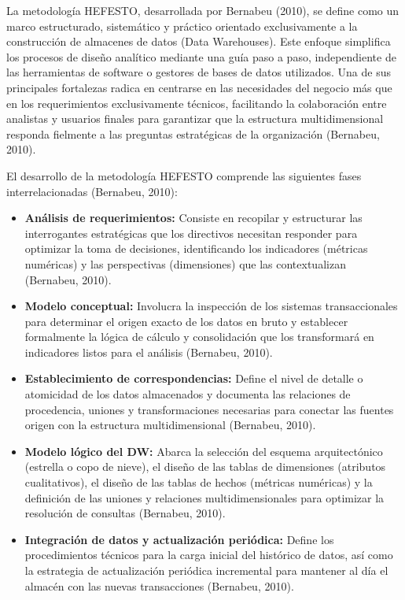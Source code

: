 \documentclass[11pt,oneside,openany]{book}
\begin{document}
La metodología HEFESTO, desarrollada por Bernabeu (2010), se define como un marco estructurado, sistemático y práctico orientado exclusivamente a la construcción de almacenes de datos (Data Warehouses). Este enfoque simplifica los procesos de diseño analítico mediante una guía paso a paso, independiente de las herramientas de software o gestores de bases de datos utilizados. Una de sus principales fortalezas radica en centrarse en las necesidades del negocio más que en los requerimientos exclusivamente técnicos, facilitando la colaboración entre analistas y usuarios finales para garantizar que la estructura multidimensional responda fielmente a las preguntas estratégicas de la organización (Bernabeu, 2010).

El desarrollo de la metodología HEFESTO comprende las siguientes fases interrelacionadas (Bernabeu, 2010):

\begin{itemize}[leftmargin=*]
\item \textbf{Análisis de requerimientos:} Consiste en recopilar y estructurar las interrogantes estratégicas que los directivos necesitan responder para optimizar la toma de decisiones, identificando los indicadores (métricas numéricas) y las perspectivas (dimensiones) que las contextualizan (Bernabeu, 2010).
\item \textbf{Modelo conceptual:} Involucra la inspección de los sistemas transaccionales para determinar el origen exacto de los datos en bruto y establecer formalmente la lógica de cálculo y consolidación que los transformará en indicadores listos para el análisis (Bernabeu, 2010).
\item \textbf{Establecimiento de correspondencias:} Define el nivel de detalle o atomicidad de los datos almacenados y documenta las relaciones de procedencia, uniones y transformaciones necesarias para conectar las fuentes origen con la estructura multidimensional (Bernabeu, 2010).
\item \textbf{Modelo lógico del DW:} Abarca la selección del esquema arquitectónico (estrella o copo de nieve), el diseño de las tablas de dimensiones (atributos cualitativos), el diseño de las tablas de hechos (métricas numéricas) y la definición de las uniones y relaciones multidimensionales para optimizar la resolución de consultas (Bernabeu, 2010).
\item \textbf{Integración de datos y actualización periódica:} Define los procedimientos técnicos para la carga inicial del histórico de datos, así como la estrategia de actualización periódica incremental para mantener al día el almacén con las nuevas transacciones (Bernabeu, 2010).
\end{itemize}
\end{document}

